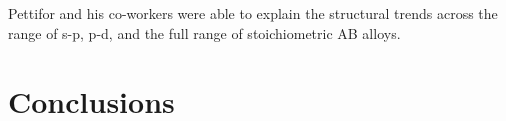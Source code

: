 Pettifor and his co-workers were able to 
explain the structural trends across the range of s-p\cite{cressoni91}, p-d\cite{pettifor86b}, 
and the full range of stoichiometric AB alloys\cite{bieber81,pettifor86a}.


\section{Conclusions}


